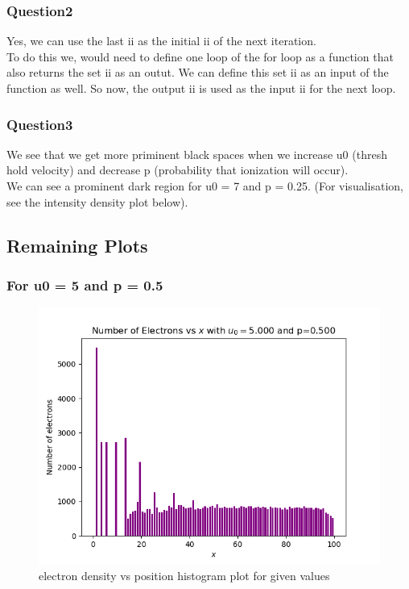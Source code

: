 \documentclass[11pt]{article}
\begin{document}
\subsubsection{Question2}
Yes, we can use the last ii as the initial ii of the next iteration.\\

To do this we, would need to define one loop of the for loop as a function that also returns the set ii as an outut. We can define this set ii as an input of the function as well. So now, the output ii is used as the input ii for the next loop.

\subsubsection{Question3}
We see that we get more priminent black spaces when we increase u0 (thresh hold velocity) and decrease p (probability that ionization will occur).\\

We can see a prominent dark region for u0 = 7 and p = 0.25. (For visualisation, see the intensity density plot below).

\subsection{Remaining Plots}

\subsubsection{For u0 = 5 and p = 0.5}

\begin{figure}[H]
    \centering
    \includegraphics[scale = 1]{2_a.png}
    \caption{electron density vs position histogram plot for given values}
\end{figure}
\end{document}
